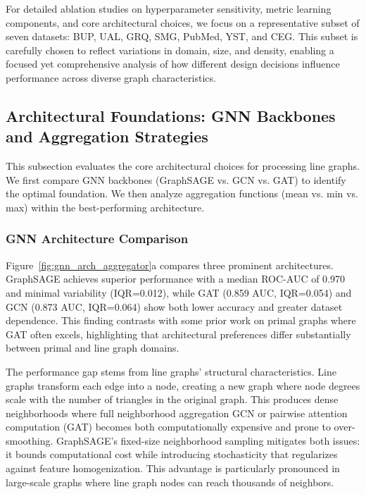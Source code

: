 \documentclass[pdflatex,sn-mathphys-num]{sn-jnl}%
\theoremstyle{thmstyleone}%
\theoremstyle{thmstyletwo}%
\theoremstyle{thmstylethree}%
\theoremstyle{plain} %
\theoremstyle{definition} %
\theoremstyle{remark} %
\theoremstyle{plain} %
\begin{document}
For detailed ablation studies on hyperparameter sensitivity, metric learning components, and core architectural choices, we focus on a representative subset of seven datasets: BUP, UAL, GRQ, SMG, PubMed, YST, and CEG. 
This subset is carefully chosen to reflect variations in domain, size, and density, enabling a focused yet comprehensive analysis of how different design decisions influence performance across diverse graph characteristics.

\subsection{Architectural Foundations: GNN Backbones and Aggregation Strategies}

This subsection evaluates the core architectural choices for processing line graphs. 
We first compare GNN backbones (GraphSAGE vs. GCN vs. GAT) to identify the optimal foundation. 
We then analyze aggregation functions (mean vs. min vs. max) within the best-performing architecture.

\subsubsection{GNN Architecture Comparison}
\label{subsubsec:gnn_arch_comparison}
Figure~\ref{fig:gnn_arch_aggregator}a compares three prominent architectures. 
GraphSAGE achieves superior performance with a median ROC-AUC of 0.970 and minimal variability (IQR=0.012), while GAT (0.859 AUC, IQR=0.054) and GCN (0.873 AUC, IQR=0.064) show both lower accuracy and greater dataset dependence. 
This finding contrasts with some prior work on primal graphs where GAT often excels, highlighting that architectural preferences differ substantially between primal and line graph domains.

The performance gap stems from line graphs' structural characteristics. 
Line graphs transform each edge into a node, creating a new graph where node degrees scale with the number of triangles in the original graph. 
This produces dense neighborhoods where full neighborhood aggregation GCN or pairwise attention computation (GAT) becomes both computationally expensive and prone to over-smoothing. 
GraphSAGE's fixed-size neighborhood sampling mitigates both issues: it bounds computational cost while introducing stochasticity that regularizes against feature homogenization. 
This advantage is particularly pronounced in large-scale graphs where line graph nodes can reach thousands of neighbors.
\end{document}
